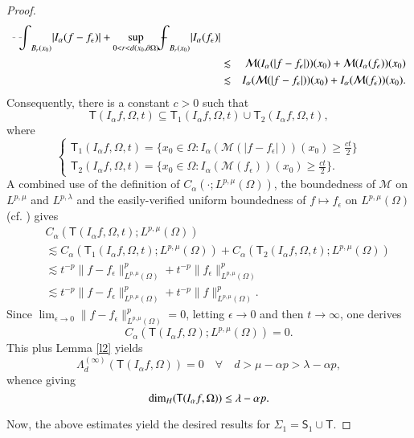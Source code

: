 \documentclass[12pt]{amsart}
\begin{document}
\begin{proof}
\begin{eqnarray*}
{{{{{\vcenter{\hbox{$\scriptscriptstyle{-}$ }}\kern-.6\wd0}}}{{{\setbox0=\hbox{$\scriptscriptstyle{\scriptscriptstyle{-}}{\int}$ }
\vcenter{\hbox{$\scriptscriptstyle{-}$ }}\kern-.6\wd0}}}\!\int}}_{B_r(x_0)}|I_\alpha(f-f_\epsilon)|+\sup_{0<r<d(x_0,\partial\Omega)} {{\mathchoice
{{{\setbox0=\hbox{$\displaystyle{\textstyle{-}}{\int}$ }
\vcenter{\hbox{$\textstyle{-}$ }}\kern-.6\wd0}}}{{{\setbox0=\hbox{$\textstyle{\scriptstyle{-}}{\int}$ }
\vcenter{\hbox{$\scriptstyle{-}$ }}\kern-.6\wd0}}}{{{\setbox0=\hbox{$\scriptstyle{\scriptscriptstyle{-}}{\int}$ }
\vcenter{\hbox{$\scriptscriptstyle{-}$ }}\kern-.6\wd0}}}{{{\setbox0=\hbox{$\scriptscriptstyle{\scriptscriptstyle{-}}{\int}$ }
\vcenter{\hbox{$\scriptscriptstyle{-}$ }}\kern-.6\wd0}}}\!\int}}_{B_r(x_0)}|I_\alpha(f_\epsilon)|\\
&\lesssim& \mathcal{M}(I_\alpha(|f-f_\epsilon|))(x_0)+\mathcal{M}(I_\alpha(f_\epsilon))(x_0)\\
&\lesssim& I_\alpha (\mathcal{M}(|f-f_\epsilon|))(x_0)+I_\alpha(\mathcal{M}(f_\epsilon))(x_0).
\end{eqnarray*}
Consequently, there is a constant $c>0$ such that
$$
\mathsf{T}(I_\alpha f,\Omega,t)\subseteq\mathsf{T}_1(I_\alpha f,\Omega,t)\cup\mathsf{T}_2(I_\alpha f,\Omega,t),
$$
where
$$
\begin{cases}
\mathsf{T}_1(I_\alpha f,\Omega,t)=\{x_0\in\Omega: I_\alpha (\mathcal{M}(|f-f_\epsilon|))(x_0)\ge\frac{ct}{2}\}\\
\mathsf{T}_2(I_\alpha f,\Omega,t)=\{x_0\in\Omega: I_\alpha(\mathcal{M}(f_\epsilon))(x_0)\ge\frac{ct}{2}\}.
\end{cases}
$$
A combined use of the definition of $C_\alpha(\cdot;L^{p,\mu}(\Omega))$, the boundedness of $\mathcal{M}$ on $L^{p,\mu}$ and $L^{p,\lambda}$ and the easily-verified uniform boundedness of $f\mapsto f_\epsilon$ on $L^{p,\mu}(\Omega)$ (cf. \cite{Z1986}) gives
\begin{eqnarray*}
&&C_\alpha(\mathsf{T}(I_\alpha f,\Omega,t); L^{p,\mu}(\Omega))\\
&&\lesssim C_\alpha(\mathsf{T}_1(I_\alpha f,\Omega,t); L^{p,\mu}(\Omega))+C_\alpha(\mathsf{T}_2(I_\alpha f,\Omega,t); L^{p,\mu}(\Omega))\\
&&\lesssim t^{-p}\|f-f_\epsilon\|^p_{L^{p,\mu}(\Omega)}+t^{-p}\|f_\epsilon\|_{L^{p,\mu}(\Omega)}^p\\
&&\lesssim t^{-p}\|f-f_\epsilon\|^p_{L^{p,\mu}(\Omega)}+t^{-p}\|f\|_{L^{p,\mu}(\Omega)}^p.
\end{eqnarray*}
Since $\lim_{\epsilon\to 0}\|f-f_\epsilon\|^p_{L^{p,\mu}(\Omega)}=0$, letting $\epsilon\to 0$ and then $t\to\infty$, one derives
$$
C_\alpha(\mathsf{T}(I_\alpha f,\Omega);L^{p,\mu}(\Omega))=0.
$$
This plus Lemma \ref{l2} yields
$$
\Lambda_d^{(\infty)}(\mathsf{T}(I_\alpha f,\Omega))=0\quad\forall\quad d>\mu-\alpha p>\lambda-\alpha p,
$$
whence giving
$$
\hbox{dim}_H(\mathsf{T}(I_\alpha f,\Omega))\le\lambda-\alpha p.
$$

Now, the above estimates yield the desired results for $\Sigma_1=\mathsf{S}_1\cup\mathsf{T}$.
\end{proof}
\end{document}
